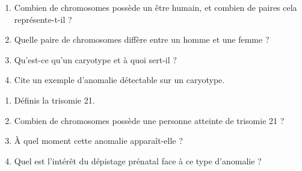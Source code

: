 \begin{enumerate}[label=\arabic*)]
\item Combien de chromosomes possède un être humain, et combien de paires cela
représente-t-il ?
\item Quelle paire de chromosomes diffère entre un homme et une femme ?
\item Qu'est-ce qu'un caryotype et à quoi sert-il ?
\item Cite un exemple d'anomalie détectable sur un caryotype.
\end{enumerate}

\sujetbac[La trisomie 21]
\begin{enumerate}[label=\arabic*)]
\item Définis la trisomie 21.
\item Combien de chromosomes possède une personne atteinte de trisomie 21 ?
\item À quel moment cette anomalie apparaît-elle ?
\item Quel est l'intérêt du dépistage prénatal face à ce type d'anomalie ?
\end{enumerate}

